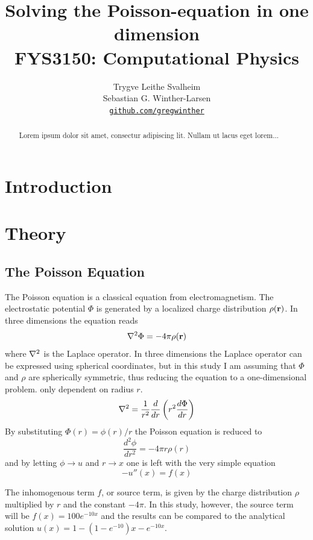 \documentclass[10pt, a4paper]{amsart}
\title[Solving the Poisson-equation in one dimension]{Solving the Poisson-equation in one dimension \\
  \hrulefill\small{ FYS3150: Computational Physics }\hrulefill}
\author[Svalheim \& Winther-Larsen]{Trygve Leithe Svalheim \\
   Sebastian G. Winther-Larsen \\
  \href{https://github.com/gregwinther/FYS3150/}{\texttt{github.com/gregwinther}}}
\begin{document}
\begin{titlepage}
\begin{abstract}
Lorem ipsum dolor sit amet, consectur adipiscing lit. Nullam ut lacus eget lorem...
\end{abstract}
\maketitle
\tableofcontents
\end{titlepage}

\section{Introduction}

\section{Theory}
\subsection{The Poisson Equation}

The Poisson equation is a classical equation from electromagnetism. The electrostatic potential $\Phi$ is generated by a localized charge distribution $\rho(\vb{r})$. In three dimensions the equation reads
\begin{equation}
\laplacian\Phi=-4\pi \rho(\vb{r})
\end{equation}
where $\laplacian$ is the Laplace operator. In three dimensions the Laplace operator can be expressed using spherical coordinates, but in this study I am assuming that $\Phi$ and $\rho$ are spherically symmetric, thus reducing the equation to a one-dimensional problem. only dependent on radius $r$.
\begin{equation}
\laplacian=\frac{1}{r^2}\frac{d}{dr}\left(r^2\frac{d\Phi}{dr} \right)
\end{equation}
By substituting $\Phi(r)=\phi(r)/r$ the Poisson equation is reduced to 
\begin{equation}
\frac{d^2\phi}{dr^2}=-4\pi r\rho(r)
\end{equation}
and by letting $\phi \rightarrow u$ and $r \rightarrow x$ one is left with the very simple equation
\begin{equation}
-u''(x)=f(x) \label{eq:2nd}
\end{equation}

The inhomogenous term $f$, or source term, is given by the charge distribution $\rho$ multiplied by $r$ and the constant $-4\pi$. In this study, however, the source term will be $f(x)=100e^{-10x}$ and the results can be compared to the analytical solution $u(x)=1-(1-e^{-10})x-e^{-10x}$. 
\end{document}
